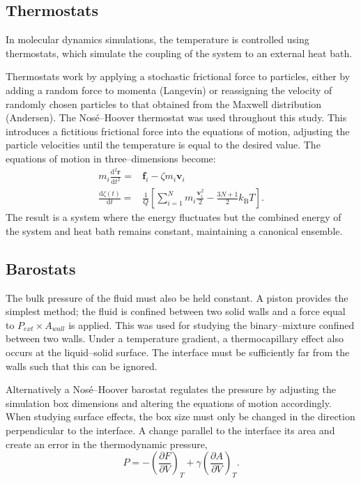 \subsection{Thermostats}\label{Thermostats}
In molecular dynamics simulations, the temperature is controlled using thermostats, which simulate the coupling of the system to an external heat bath.

Thermostats work by applying a stochastic frictional force to particles, either by adding a random force to momenta (Langevin)\cite{Langevin} or reassigning the velocity of randomly chosen particles to that obtained from the Maxwell distribution (Andersen)\cite{AndersonTherm}.
The Nos\'{e}--Hoover thermostat was used throughout this study.
This introduces a fictitious frictional force into the equations of motion, adjusting the particle velocities until the temperature is equal to the desired value.\cite{NoseHoover1, NoseHoover2, NoseHoover3}
The equations of motion in three--dimensions become:
\begin{align}
m_{i}\frac{\mathrm{d}^{2}\mathbf{r}_{}}{\mathrm{d} t ^{2}} =& \mathbf{f}_{i} - \zeta m_{i} \mathbf{v}_{i}\\
\frac{\mathrm{d} \zeta (t)}{\mathrm{d} t} =& \frac{1}{Q}\left[ \sum_{i=1}^{N} m_{i} \frac{\mathbf{v}^{2}_{i}}{2} - \frac{3N+1}{2}k_{\mathrm{B}}T\right].
\end{align}
The result is a system where the energy fluctuates but the combined energy of the system and heat bath remains constant, maintaining a canonical ensemble.

\subsection{Barostats}\label{Barostats}
The bulk pressure of the fluid must also be held constant.
A piston provides the simplest method; the fluid is confined between two solid walls and a force equal to $P_{ext} \times A_{wall}$ is applied.
This was used for studying the binary--mixture confined between two walls.
Under a temperature gradient, a thermocapillary effect also occurs at the liquid--solid surface.
The interface must be sufficiently far from the walls such that this can be ignored.

Alternatively a Nos\'{e}--Hoover barostat regulates the pressure by adjusting the simulation box dimensions and altering the equations of motion accordingly. \cite{NoseHoover1, NoseHoover2, NoseHoover3}
When studying surface effects, the box size must only be changed in the direction perpendicular to the interface.
A change parallel to the interface its area and create an error in the thermodynamic pressure,
\begin{equation}
P = - \left( \frac{\partial F}{\partial V} \right)_{T} + \gamma \left( \frac{\partial A}{\partial V} \right)_{T}.
\end{equation}

